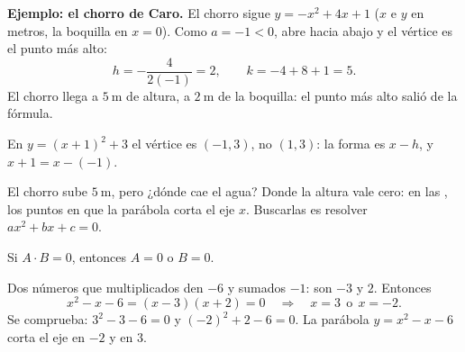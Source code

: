 \documentclass[11pt,a4paper]{article}
\begin{document}
\begin{minipage}[c]{0.46\linewidth}
\textbf{Ejemplo: el chorro de Caro.} El chorro sigue $y=-x^2+4x+1$ ($x$ e $y$ en metros, la boquilla en $x=0$).
Como $a=-1<0$, abre hacia abajo y el vértice es el punto más alto:
\[ h=-\frac{4}{2(-1)}=2,\qquad k=-4+8+1=5 . \]
El chorro llega a $\SI{5}{\metre}$ de altura, a $\SI{2}{\metre}$ de la boquilla: el punto más alto salió de la
fórmula.
\end{minipage}\hfill
\begin{minipage}[c]{0.5\linewidth}\centering
{}
\end{minipage}

\begin{ojo}[El signo de $h$]
En $y=(x+1)^2+3$ el vértice es $(-1,3)$, no $(1,3)$: la forma es $x-h$, y $x+1=x-(-1)$.
\end{ojo}


El chorro sube $\SI{5}{\metre}$, pero ¿dónde cae el agua? Donde la altura vale cero: en las , los
puntos en que la parábola corta el eje $x$. Buscarlas es resolver $ax^2+bx+c=0$.

\begin{propiedad}
Si $A\cdot B=0$, entonces $A=0$ o $B=0$.
\end{propiedad}
\begin{ejemplo}[Una que se deja factorizar: $x^2-x-6=0$]
Dos números que multiplicados den $-6$ y sumados $-1$: son $-3$ y $2$. Entonces
\[ x^2-x-6=(x-3)(x+2)=0\quad\Longrightarrow\quad x=3\ \ \text{o}\ \ x=-2 . \]
Se comprueba: $3^2-3-6=0$ y $(-2)^2+2-6=0$. La parábola $y=x^2-x-6$ corta el eje en $-2$ y en $3$.
\end{ejemplo}
\end{document}
